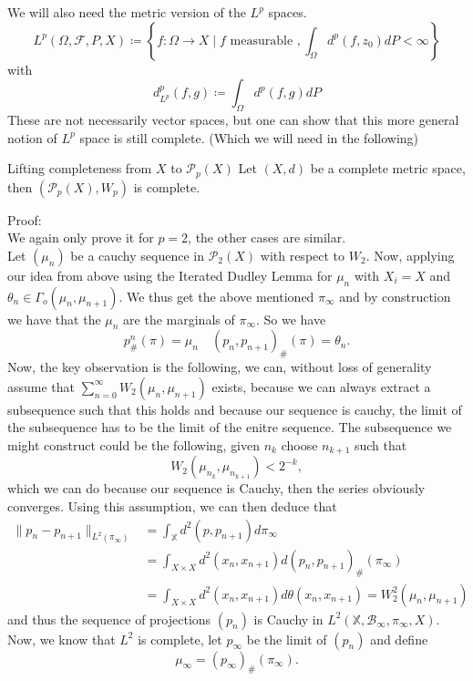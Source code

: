 \documentclass[15pt]{article}
\begin{document}
We will also need the metric version of the $L^p$ spaces.
$$L^p(\Omega,\mathcal{F}, P, X) \coloneqq \left\{ f : \Omega \rightarrow X \mid f \text{ measurable }, \int_\Omega d^p(f,z_0) d P < \infty \right\}$$ with$$d_{L^p}^p(f,g) \coloneqq \int_\Omega d^p(f,g) dP$$
These are not necessarily vector spaces, but one can show that this more general notion of $L^p$ space is still complete. (Which we will need in the following)

\begin{theorem}{Lifting completeness from $X$ to $\mathcal{P}_p(X)$}{}
  Let $(X,d)$ be a complete metric space, then $(\mathcal{P}_p(X), W_p)$ is complete.
\end{theorem}

Proof: 
\vspace{0.3cm} \\
We again only prove it for $p = 2$, the other cases are similar.  \\

Let $(\mu_n)$ be a cauchy sequence in $\mathcal{P}_2(X)$ with respect to $W_2$. Now, applying our idea from above using the Iterated Dudley Lemma for $\mu_n$ with $X_i = X$ and $\theta_n \in \Gamma_o(\mu_n,\mu_{n+1})$.
We thus get the above mentioned $\pi_\infty$ and by construction we have that the $\mu_n$ are the marginals of $\pi_\infty$. So we have $$p^n_{\#}(\pi) = \mu_n \quad (p_n,p_{n+1})_{\#}(\pi) = \theta_n.$$ 
Now, the key observation is the following, we can, without loss of generality assume that $\sum\limits_{n = 0}^\infty W_2(\mu_n,\mu_{n+1})$ exists, 
because we can always extract a subsequence such that this holds and because our sequence is cauchy, the limit of the subsequence has to be the limit of the enitre sequence. 
The subsequence we might construct could be the following, given $n_k$ choose $n_{k+1}$ such that $$W_2(\mu_{n_k},\mu_{n_{k+1}}) < 2^{-k},$$ 
which we can do because our sequence is Cauchy, then the series obviously converges.   
Using this assumption, we can then deduce that  
\begin{align*}\|p_n-p_{n+1}\|_{L^2(\pi_{\infty})} &= \int_\mathbb{X} d^2(p,p_{n+1}) d\pi_\infty \\ &= \int_{X \times X} d^2(x_n, x_{n+1}) d(p_n,p_{n+1})_{\#}(\pi_\infty) \\ &= \int_{X \times X} d^2(x_n,x_{n+1}) d\theta(x_n,x_{n+1}) = W_2^2(\mu_n,\mu_{n+1})\end{align*} 
and thus the sequence of projections $(p_n)$ is Cauchy in $L^2(\mathbb{X},\mathcal{B}_\infty,\pi_\infty, X)$. Now, we know that $L^2$ is complete, let $p_\infty$ be the limit of $(p_n)$ and define $$\mu_\infty = (p_\infty)_{\#}(\pi_\infty).$$
\end{document}
